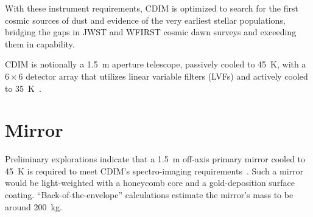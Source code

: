 \documentclass{ws-jai}
\begin{document}
With these instrument requirements, CDIM is optimized to search for the first cosmic sources of dust and evidence of the very earliest stellar populations, bridging the gaps in JWST and WFIRST cosmic dawn surveys and exceeding them in capability.

CDIM is notionally a \SI{1.5}{\meter} aperture telescope, passively cooled to \SI{45}{\kelvin}, with a $6\times6$ detector array that utilizes linear variable filters (LVFs) and actively cooled to \SI{35}{\kelvin}~\cite{cooray2016cdim2page}.



\section{Mirror}
\label{S:mirror}
Preliminary explorations indicate that a \SI{1.5}{\meter} off-axis primary mirror cooled to \SI{45}{\kelvin} is required to meet CDIM's spectro-imaging requirements~\cite{cooray2016cdim2page}.
Such a mirror would be light-weighted with a honeycomb core and a gold-deposition surface coating.
``Back-of-the-envelope'' calculations estimate the mirror's mass to be around \SI{200}{\kilo\gram}.
\end{document}

